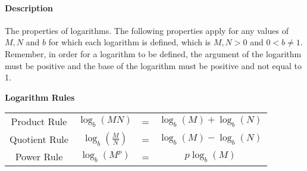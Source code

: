 \documentclass[12pt]{article}
\begin{document}
\paragraph{Description} The properties of logarithms. The following properties apply for any values of $M, N$ and $b$ for which each logarithm is defined, which is $M,N > 0$ and $0 < b \ne 1$. Remember, in order for a logarithm to be defined, the argument of the logarithm must be positive and the base of the logarithm must be positive and not equal to 1.

{ %
\begin{center}
\textbf{Logarithm Rules} \vspace{3mm} \\
\LARGE \def\arraystretch{2} %
\begin{tabular}{cccc}
  Product Rule & $\log_{b}(MN)$ & = & $\log_{b}(M) + \log_{b}(N)$ \\
  Quotient Rule & $\log_{b}(\frac{M}{N})$ & = & $\log_{b}(M) - \log_{b}(N)$ \\
  Power Rule & $\log_{b}(M^{p})$ & = & $p\log_{b}(M)$ \\
\end{tabular} \\
\end{center}
}
\end{document}
